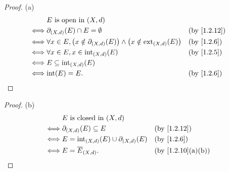 \begin{proof}{(a)}
  \begin{align*}
         & E \text{ is open in } (X, d)                                                                                              \\
    \iff & \partial_{(X, d)}(E) \cap E = \emptyset                                                                  &  & \by{1.2.12} \\
    \iff & \forall x \in E, \big(x \notin \partial_{(X, d)}(E)\big) \land \big(x \notin \text{ext}_{(X, d)}(E)\big) &  & \by{1.2.6}  \\
    \iff & \forall x \in E, x \in \text{int}_{(X, d)}(E)                                                            &  & \by{1.2.5}  \\
    \iff & E \subseteq \text{int}_{(X, d)}(E)                                                                                        \\
    \iff & \text{int}(E) = E.                                                                                       &  & \by{1.2.6}
  \end{align*}
\end{proof}

\begin{proof}{(b)}
  \begin{align*}
         & E \text{ is closed in } (X, d)                                                            \\
    \iff & \partial_{(X, d)}(E) \subseteq E                     &  & \by{1.2.12}                     \\
    \iff & E = \text{int}_{(X, d)}(E) \cup \partial_{(X, d)}(E) &  & \by{1.2.6}                      \\
    \iff & E = \overline{E}_{(X, d)}.                           &  & \text{(by \cref{1.2.10}(a)(b))}
  \end{align*}
\end{proof}

